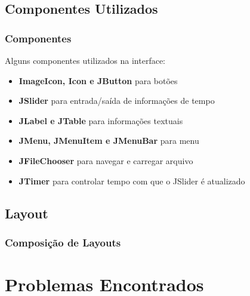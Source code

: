 \documentclass{beamer}
\begin{document}
\subsection{Componentes Utilizados}
\begin{frame}
	\frametitle{Componentes}
Alguns componentes utilizados na interface:	
	\begin{itemize}
		\item \textbf{ImageIcon, Icon e JButton} para botões
		\item \textbf{JSlider} para entrada/saída de informações de tempo
		\item \textbf{JLabel e JTable} para informações textuais
		\item \textbf{JMenu, JMenuItem e JMenuBar} para menu
		\item \textbf{JFileChooser} para navegar e carregar arquivo 
		\item \textbf{JTimer} para controlar tempo com que o JSlider é atualizado
	\end{itemize}
\end{frame}

\subsection{Layout}
\begin{frame}
  \frametitle{Composição de Layouts}

\end{frame}




\section{Problemas Encontrados}
\end{document}
